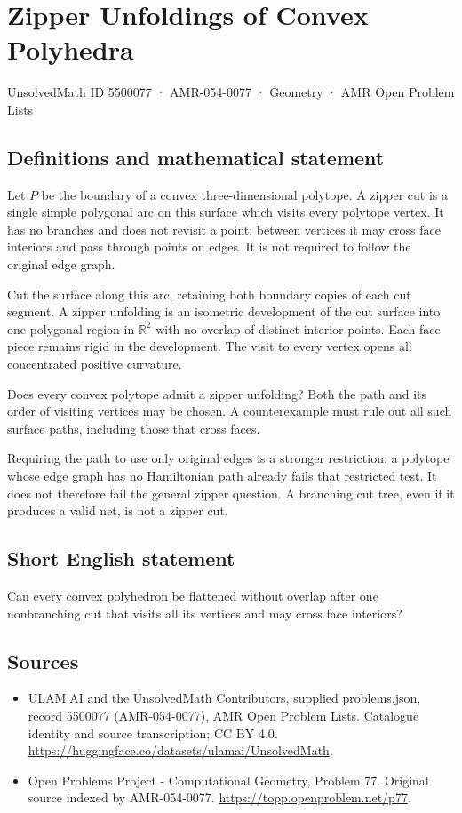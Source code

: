 \documentclass[11pt,a4paper]{article}
\begin{document}
\section*{Zipper Unfoldings of Convex Polyhedra}\label{5500077}
{\small UnsolvedMath ID 5500077 · AMR-054-0077 · Geometry · AMR Open Problem Lists}
\subsection{Definitions and mathematical statement}
Let $P$ be the boundary of a convex three-dimensional polytope.
A zipper cut is a single simple polygonal arc on this surface
which visits every polytope vertex. It has no branches and does
not revisit a point; between vertices it may cross face interiors
and pass through points on edges. It is not required to follow
the original edge graph.

Cut the surface along this arc, retaining both boundary copies
of each cut segment. A zipper unfolding is an isometric
development of the cut surface into one polygonal region in
$\mathbb R^2$ with no overlap of distinct interior points. Each
face piece remains rigid in the development. The visit to every
vertex opens all concentrated positive curvature.

Does every convex polytope admit a zipper unfolding? Both the
path and its order of visiting vertices may be chosen. A
counterexample must rule out all such surface paths, including
those that cross faces.

Requiring the path to use only original edges is a stronger
restriction: a polytope whose edge graph has no Hamiltonian path
already fails that restricted test. It does not therefore fail
the general zipper question. A branching cut tree, even if it
produces a valid net, is not a zipper cut.
\subsection{Short English statement}
Can every convex polyhedron be flattened without overlap after
one nonbranching cut that visits all its vertices and may cross
face interiors?
\subsection{Sources}
\begin{itemize}
\item[S1] ULAM.AI and the UnsolvedMath Contributors, supplied problems.json, record 5500077 (AMR-054-0077), AMR Open Problem Lists. Catalogue identity and source transcription; CC BY 4.0.
\url{https://huggingface.co/datasets/ulamai/UnsolvedMath}.
\item[S2] Open Problems Project - Computational Geometry, Problem 77. Original source indexed by AMR-054-0077.
\url{https://topp.openproblem.net/p77}.
\end{itemize}
\end{document}
